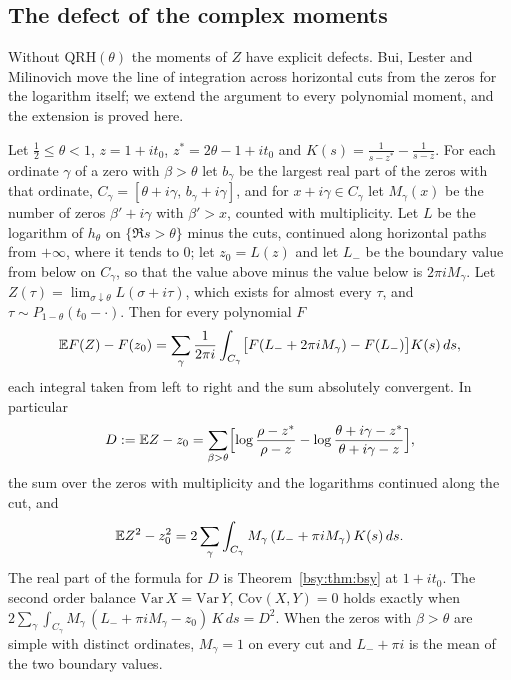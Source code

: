 \subsection{The defect of the complex moments}\label{bsy:sec:cuts}

Without $\mathrm{QRH}(\theta)$ the moments of $Z$ have explicit defects. Bui, Lester and Milinovich \cite{BLM14} move the line of integration across horizontal cuts from the zeros for the logarithm itself; we extend the argument to every polynomial moment, and the extension is proved here.

\begin{proposition}\label{bsy:prop:cuts}
Let $\frac12\le\theta<1$, $z=1+it_0$, $z^*=2\theta-1+it_0$ and $K(s)=\frac1{s-z^*}-\frac1{s-z}$. For each ordinate $\gamma$ of a zero with $\beta>\theta$ let $b_\gamma$ be the largest real part of the zeros with that ordinate, $C_\gamma=[\theta+i\gamma,\,b_\gamma+i\gamma]$, and for $x+i\gamma\in C_\gamma$ let $M_\gamma(x)$ be the number of zeros $\beta'+i\gamma$ with $\beta'>x$, counted with multiplicity. Let $L$ be the logarithm of $h_\theta$ on $\{\Re s>\theta\}$ minus the cuts, continued along horizontal paths from $+\infty$, where it tends to $0$; let $z_0=L(z)$ and let $L_-$ be the boundary value from below on $C_\gamma$, so that the value above minus the value below is $2\pi iM_\gamma$. Let $Z(\tau)=\lim_{\sigma\downarrow\theta}L(\sigma+i\tau)$, which exists for almost every $\tau$, and $\tau\sim P_{1-\theta}(t_0-\cdot)$. Then for every polynomial $F$
\[
\mathbb{E} F(Z)-F(z_0)=\sum_\gamma\frac1{2\pi i}\int_{C_\gamma}\bigl[F(L_-+2\pi iM_\gamma)-F(L_-)\bigr]K(s)\,ds,
\]
each integral taken from left to right and the sum absolutely convergent. In particular
\[
D:=\mathbb{E} Z-z_0=\sum_{\beta>\theta}\Bigl[\log\frac{\rho-z^*}{\rho-z}-\log\frac{\theta+i\gamma-z^*}{\theta+i\gamma-z}\Bigr],
\]
the sum over the zeros with multiplicity and the logarithms continued along the cut, and
\[
\mathbb{E} Z^2-z_0^2=2\sum_\gamma\int_{C_\gamma}M_\gamma\,(L_-+\pi iM_\gamma)\,K(s)\,ds .
\]
The real part of the formula for $D$ is Theorem~\ref{bsy:thm:bsy} at $1+it_0$. The second order balance $\mathrm{Var}\,X=\mathrm{Var}\,Y$, $\mathrm{Cov}(X,Y)=0$ holds exactly when $2\sum_\gamma\int_{C_\gamma}M_\gamma\,(L_-+\pi iM_\gamma-z_0)\,K\,ds=D^2$. When the zeros with $\beta>\theta$ are simple with distinct ordinates, $M_\gamma=1$ on every cut and $L_-+\pi i$ is the mean of the two boundary values.
\end{proposition}

